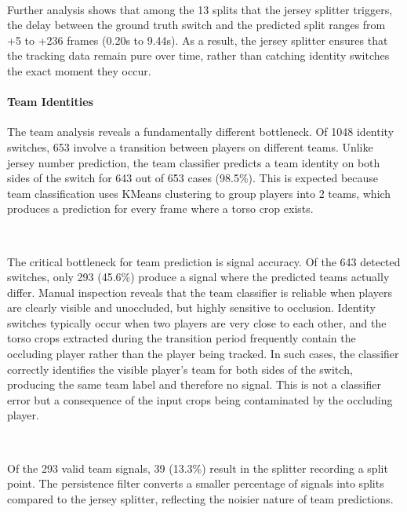 \

Further analysis shows that among the 13 splits that the jersey splitter triggers, the delay between the ground truth switch and the predicted split ranges from +5 to +236 frames (0.20s to 9.44s). As a result, the jersey splitter ensures that the tracking data remain pure over time, rather than catching identity switches the exact moment they occur.


\paragraph{Team Identities}
The team analysis reveals a fundamentally different bottleneck. Of 1048 identity switches, 653 involve a transition between players on different teams. Unlike jersey number prediction, the team classifier predicts a team identity on both sides of the switch for 643 out of 653 cases (98.5\%). This is expected because team classification uses KMeans clustering to group players into 2 teams, which produces a prediction for every frame where a torso crop exists.

\

The critical bottleneck for team prediction is signal accuracy. Of the 643 detected switches, only 293 (45.6\%) produce a signal where the predicted teams actually differ. Manual inspection reveals that the team classifier is reliable when players are clearly visible and unoccluded, but highly sensitive to occlusion. Identity switches typically occur when two players are very close to each other, and the torso crops extracted during the transition period frequently contain the occluding player rather than the player being tracked. In such cases, the classifier correctly identifies the visible player's team for both sides of the switch, producing the same team label and therefore no signal. This is not a classifier error but a consequence of the input crops being contaminated by the occluding player.

\

Of the 293 valid team signals, 39 (13.3\%) result in the splitter recording a split point. The persistence filter converts a smaller percentage of signals into splits compared to the jersey splitter, reflecting the noisier nature of team predictions.


